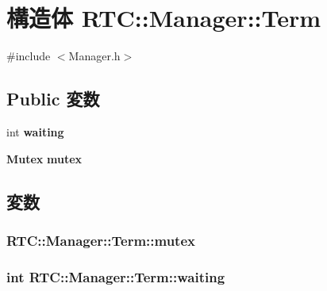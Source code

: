\section{構造体 RTC::Manager::Term}
\label{structRTC_1_1Manager_1_1Term}


{\ttfamily \#include $<$Manager.h$>$}

\subsection*{Public 変数}
\begin{DoxyCompactItemize}
\item 
int {\bf waiting}
\item 
{\bf Mutex} {\bf mutex}
\end{DoxyCompactItemize}


\subsection{変数}
\subsubsection[{mutex}]{ {\bf RTC::Manager::Term::mutex}}\label{structRTC_1_1Manager_1_1Term_ab4f986ea0c213e9d3048eb7f2b72a846}
\subsubsection[{waiting}]{\setlength{\rightskip}{0pt plus 5cm}int {\bf RTC::Manager::Term::waiting}}\label{structRTC_1_1Manager_1_1Term_abbe5810052f7e37453da75dc74032327}
